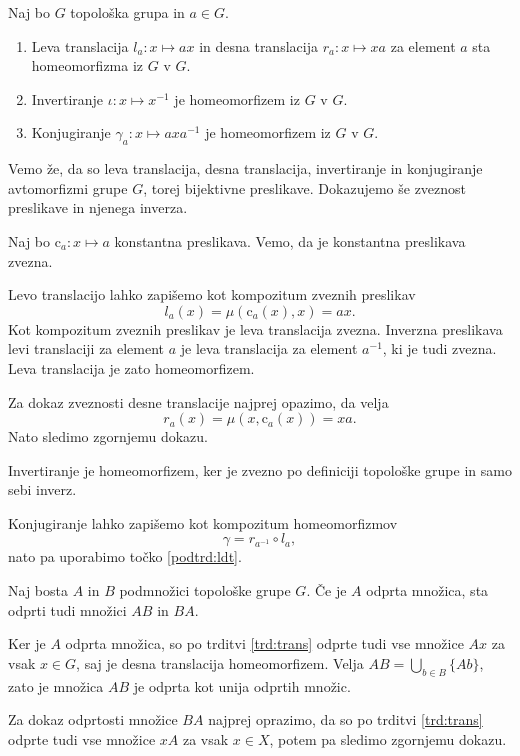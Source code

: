 \documentclass[mat1]{fmfdelo}
\begin{document}
\begin{trditev}\label{trd:trans}
Naj bo $G$ topološka grupa in $a \in G$.
\begin{enumerate}
\item Leva translacija $l_a\colon x \mapsto ax$ in desna translacija $r_a\colon x \mapsto xa$ za element $a$ sta homeomorfizma iz $G$ v $G$.\label{podtrd:ldt}
\item Invertiranje $\iota\colon x \mapsto x^{-1}$ je homeomorfizem iz $G$ v $G$.
\item Konjugiranje $\gamma_a\colon x \mapsto axa^{-1}$ je homeomorfizem iz $G$ v $G$.
\end{enumerate}
\end{trditev}

\begin{dokaz}
Vemo že, da so leva translacija, desna translacija, invertiranje in konjugiranje avtomorfizmi grupe $G$, torej bijektivne preslikave. Dokazujemo še zveznost preslikave in njenega inverza.

Naj bo $\text{c}_a\colon x \mapsto a$ konstantna preslikava. Vemo, da je konstantna preslikava zvezna.

Levo translacijo lahko zapišemo kot kompozitum zveznih preslikav \[l_a(x) = \mu(\text{c}_a(x), x) = ax.\]
Kot kompozitum zveznih preslikav je leva translacija zvezna. Inverzna preslikava levi translaciji za element $a$ je leva translacija za element $a^{-1}$, ki je tudi zvezna. Leva translacija je zato homeomorfizem.

Za dokaz zveznosti desne translacije najprej opazimo, da velja
\[r_a(x) = \mu(x, \text{c}_a(x)) = xa.\]
Nato sledimo zgornjemu dokazu.

Invertiranje je homeomorfizem, ker je zvezno po definiciji topološke grupe in samo sebi inverz.

Konjugiranje lahko zapišemo kot kompozitum homeomorfizmov \[\gamma = r_{a^{-1}} \circ l_a,\]
nato pa uporabimo točko \ref{podtrd:ldt}.
\end{dokaz}

\begin{trditev}\label{trd:prododp}
Naj bosta $A$ in $B$ podmnožici topološke grupe $G$. Če je $A$ odprta množica, sta odprti tudi množici $AB$ in $BA$.
\end{trditev}

\begin{dokaz}
Ker je $A$ odprta množica, so po trditvi \ref{trd:trans} odprte tudi vse množice $Ax$ za vsak $x \in G$, saj je desna translacija homeomorfizem. Velja $AB = \bigcup_{b \in B}\lbrace Ab\rbrace$, zato je množica $AB$ je odprta kot unija odprtih množic.

Za dokaz odprtosti množice $BA$ najprej oprazimo, da so po trditvi \ref{trd:trans} odprte tudi vse množice $xA$ za vsak $x \in X$, potem pa sledimo zgornjemu dokazu.
\end{dokaz}
\end{document}
